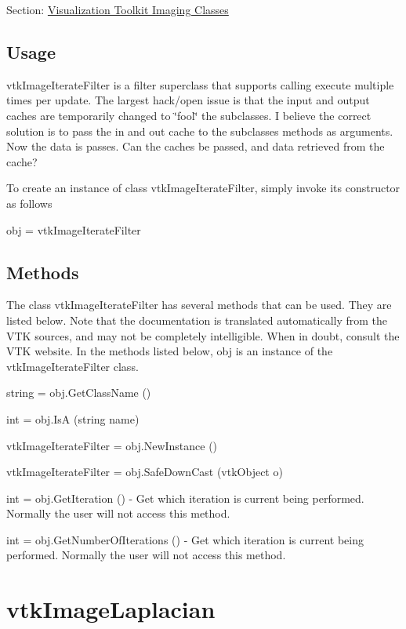 Section\-: \hyperlink{sec_vtkimaging}{Visualization Toolkit Imaging Classes} \hypertarget{vtkwidgets_vtkxyplotwidget_Usage}{}\subsection{Usage}\label{vtkwidgets_vtkxyplotwidget_Usage}
vtk\-Image\-Iterate\-Filter is a filter superclass that supports calling execute multiple times per update. The largest hack/open issue is that the input and output caches are temporarily changed to \char`\"{}fool\char`\"{} the subclasses. I believe the correct solution is to pass the in and out cache to the subclasses methods as arguments. Now the data is passes. Can the caches be passed, and data retrieved from the cache?

To create an instance of class vtk\-Image\-Iterate\-Filter, simply invoke its constructor as follows \begin{DoxyVerb}  obj = vtkImageIterateFilter
\end{DoxyVerb}
 \hypertarget{vtkwidgets_vtkxyplotwidget_Methods}{}\subsection{Methods}\label{vtkwidgets_vtkxyplotwidget_Methods}
The class vtk\-Image\-Iterate\-Filter has several methods that can be used. They are listed below. Note that the documentation is translated automatically from the V\-T\-K sources, and may not be completely intelligible. When in doubt, consult the V\-T\-K website. In the methods listed below, {\ttfamily obj} is an instance of the vtk\-Image\-Iterate\-Filter class. 
\begin{DoxyItemize}
\item {\ttfamily string = obj.\-Get\-Class\-Name ()}  
\item {\ttfamily int = obj.\-Is\-A (string name)}  
\item {\ttfamily vtk\-Image\-Iterate\-Filter = obj.\-New\-Instance ()}  
\item {\ttfamily vtk\-Image\-Iterate\-Filter = obj.\-Safe\-Down\-Cast (vtk\-Object o)}  
\item {\ttfamily int = obj.\-Get\-Iteration ()} -\/ Get which iteration is current being performed. Normally the user will not access this method.  
\item {\ttfamily int = obj.\-Get\-Number\-Of\-Iterations ()} -\/ Get which iteration is current being performed. Normally the user will not access this method.  
\end{DoxyItemize}\hypertarget{vtkimaging_vtkimagelaplacian}{}\section{vtk\-Image\-Laplacian}\label{vtkimaging_vtkimagelaplacian}
